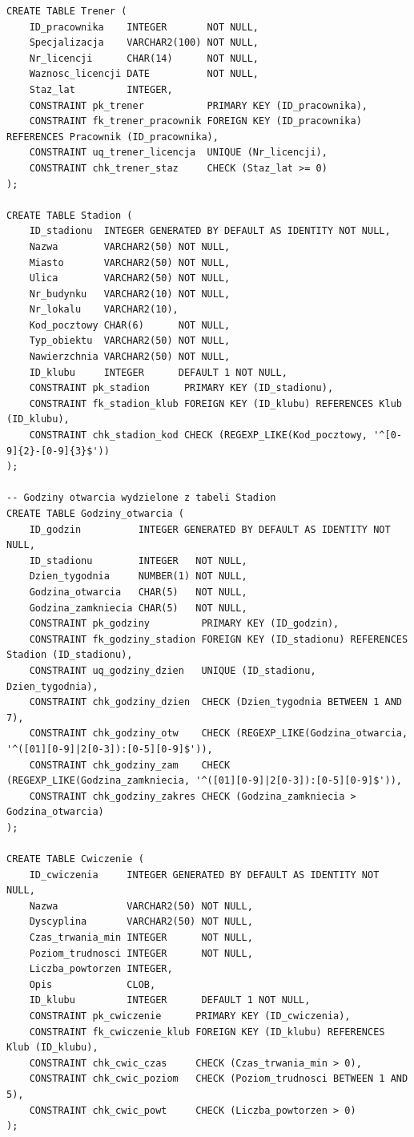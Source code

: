 \documentclass[11pt,a4paper]{article}
\begin{document}
\begin{lstlisting}[basicstyle=\ttfamily\footnotesize, caption={Poprawiony skrypt SQL tworzący strukturę bazy danych}]
CREATE TABLE Trener (
    ID_pracownika    INTEGER       NOT NULL,
    Specjalizacja    VARCHAR2(100) NOT NULL,
    Nr_licencji      CHAR(14)      NOT NULL,
    Waznosc_licencji DATE          NOT NULL,
    Staz_lat         INTEGER,
    CONSTRAINT pk_trener           PRIMARY KEY (ID_pracownika),
    CONSTRAINT fk_trener_pracownik FOREIGN KEY (ID_pracownika) REFERENCES Pracownik (ID_pracownika),
    CONSTRAINT uq_trener_licencja  UNIQUE (Nr_licencji),
    CONSTRAINT chk_trener_staz     CHECK (Staz_lat >= 0)
);

CREATE TABLE Stadion (
    ID_stadionu  INTEGER GENERATED BY DEFAULT AS IDENTITY NOT NULL,
    Nazwa        VARCHAR2(50) NOT NULL,
    Miasto       VARCHAR2(50) NOT NULL,
    Ulica        VARCHAR2(50) NOT NULL,
    Nr_budynku   VARCHAR2(10) NOT NULL,
    Nr_lokalu    VARCHAR2(10),
    Kod_pocztowy CHAR(6)      NOT NULL,
    Typ_obiektu  VARCHAR2(50) NOT NULL,
    Nawierzchnia VARCHAR2(50) NOT NULL,
    ID_klubu     INTEGER      DEFAULT 1 NOT NULL,
    CONSTRAINT pk_stadion      PRIMARY KEY (ID_stadionu),
    CONSTRAINT fk_stadion_klub FOREIGN KEY (ID_klubu) REFERENCES Klub (ID_klubu),
    CONSTRAINT chk_stadion_kod CHECK (REGEXP_LIKE(Kod_pocztowy, '^[0-9]{2}-[0-9]{3}$'))
);

-- Godziny otwarcia wydzielone z tabeli Stadion
CREATE TABLE Godziny_otwarcia (
    ID_godzin          INTEGER GENERATED BY DEFAULT AS IDENTITY NOT NULL,
    ID_stadionu        INTEGER   NOT NULL,
    Dzien_tygodnia     NUMBER(1) NOT NULL,
    Godzina_otwarcia   CHAR(5)   NOT NULL,
    Godzina_zamkniecia CHAR(5)   NOT NULL,
    CONSTRAINT pk_godziny         PRIMARY KEY (ID_godzin),
    CONSTRAINT fk_godziny_stadion FOREIGN KEY (ID_stadionu) REFERENCES Stadion (ID_stadionu),
    CONSTRAINT uq_godziny_dzien   UNIQUE (ID_stadionu, Dzien_tygodnia),
    CONSTRAINT chk_godziny_dzien  CHECK (Dzien_tygodnia BETWEEN 1 AND 7),
    CONSTRAINT chk_godziny_otw    CHECK (REGEXP_LIKE(Godzina_otwarcia, '^([01][0-9]|2[0-3]):[0-5][0-9]$')),
    CONSTRAINT chk_godziny_zam    CHECK (REGEXP_LIKE(Godzina_zamkniecia, '^([01][0-9]|2[0-3]):[0-5][0-9]$')),
    CONSTRAINT chk_godziny_zakres CHECK (Godzina_zamkniecia > Godzina_otwarcia)
);

CREATE TABLE Cwiczenie (
    ID_cwiczenia     INTEGER GENERATED BY DEFAULT AS IDENTITY NOT NULL,
    Nazwa            VARCHAR2(50) NOT NULL,
    Dyscyplina       VARCHAR2(50) NOT NULL,
    Czas_trwania_min INTEGER      NOT NULL,
    Poziom_trudnosci INTEGER      NOT NULL,
    Liczba_powtorzen INTEGER,
    Opis             CLOB,
    ID_klubu         INTEGER      DEFAULT 1 NOT NULL,
    CONSTRAINT pk_cwiczenie      PRIMARY KEY (ID_cwiczenia),
    CONSTRAINT fk_cwiczenie_klub FOREIGN KEY (ID_klubu) REFERENCES Klub (ID_klubu),
    CONSTRAINT chk_cwic_czas     CHECK (Czas_trwania_min > 0),
    CONSTRAINT chk_cwic_poziom   CHECK (Poziom_trudnosci BETWEEN 1 AND 5),
    CONSTRAINT chk_cwic_powt     CHECK (Liczba_powtorzen > 0)
);


\end{lstlisting}
\end{document}
